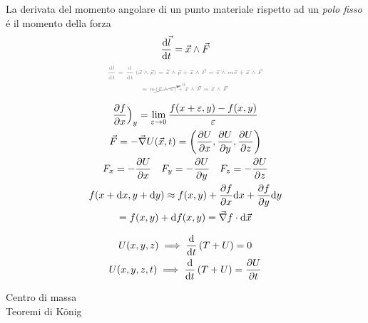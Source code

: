 \begin{multicols}{3}
  La derivata del momento angolare di un punto materiale rispetto ad un
  \textit{polo fisso} \'e il momento della forza
  \begin{equation}
    \label{eq:teorema-momento-angolare}
    \dv{\vec{l}}{t} = \vec{x} \wedge \vec{F}
  \end{equation}
  \begin{equation*}
    \myproof{
      \begin{gathered}
        \dv{l}{t} = \dv{t}\left(\vec{x} \wedge \vec{p}\right) =
        \dot{\vec{x}} \wedge \vec{p} + \vec{x} \wedge \vec{F} =
        \vec{v} \wedge m\vec{v} + \vec{x} \wedge \vec{F} \\
        = m\cancelto{0}{(\vec{v} \wedge \vec{v})} + \vec{x} \wedge \vec{F} =
        \vec{x} \wedge \vec{F}
      \end{gathered}}
  \end{equation*}

  \begin{equation}
    \label{eq:campi-conservativi}
    \begin{gathered}
      \pdv{f}{x} \Big)_y = \lim_{\varepsilon \to 0} \frac{f(x + \varepsilon, y) - f(x, y)}{\varepsilon}\\
      \vec{F} = -\vec{\nabla}U(\vec{x}, t) = \left(
        \pdv{U}{x}, \pdv{U}{y}, \pdv{U}{z}
      \right) \\
      F_x = -\pdv{U}{x} \quad F_y = -\pdv{U}{y} \quad F_z = -\pdv{U}{z} \\
      f(x + \text{d}x, y + \text{d}y) \approx f(x, y) + \pdv{f}{x}\text{d}x
      + \pdv{f}{y}\text{d}y \\
      = f(x, y) + \text{d}f(x, y) = \vec{\nabla}f \cdot \text{d}\vec{x}
    \end{gathered}
  \end{equation}

  \begin{equation}
    \label{eq:conservazione-meccanica}
    \begin{gathered}
      U(x, y, z) \implies \dv{t}\left(T + U\right) = 0 \\
      U(x, y, z, t) \implies \dv{t}\left(T + U\right) = \pdv{U}{t}
    \end{gathered}
  \end{equation}

  Centro di massa \\
  Teoremi di K\"onig


\end{multicols}




